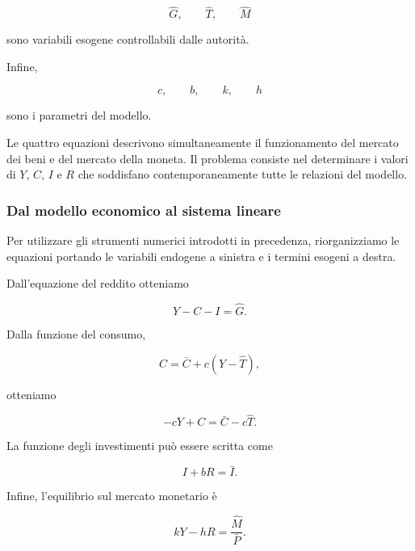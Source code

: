 \begin{equation*}
    \hat G,\qquad \hat T,\qquad \hat M
\end{equation*}

sono variabili esogene controllabili dalle autorità.

Infine,

\begin{equation*}
    c,\qquad b,\qquad k,\qquad h
\end{equation*}

sono i parametri del modello.

Le quattro equazioni descrivono simultaneamente il funzionamento
del mercato dei beni e del mercato della moneta. Il problema
consiste nel determinare i valori di $Y$, $C$, $I$ e $R$ che
soddisfano contemporaneamente tutte le relazioni del modello.


\subsubsection{Dal modello economico al sistema lineare}

Per utilizzare gli strumenti numerici introdotti in precedenza,
riorganizziamo le equazioni portando le variabili endogene a
sinistra e i termini esogeni a destra.

Dall'equazione del reddito otteniamo

\begin{equation*}
    Y-C-I=\hat G.
\end{equation*}

Dalla funzione del consumo,

\begin{equation*}
    C=\bar C+c(Y-\hat T),
\end{equation*}

otteniamo

\begin{equation*}
    -cY+C=\bar C-c\hat T.
\end{equation*}

La funzione degli investimenti può essere scritta come

\begin{equation*}
    I+bR=\bar I.
\end{equation*}

Infine, l'equilibrio sul mercato monetario è

\begin{equation*}
    kY-hR=\frac{\hat M}{\bar P}.
\end{equation*}

